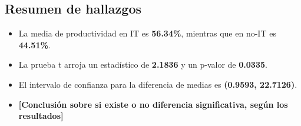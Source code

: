 \subsection{Resumen de hallazgos}

\begin{itemize}
    \item La media de productividad en IT es \textbf{56.34\%}, mientras que en no-IT es \textbf{44.51\%}.
    \item La prueba t arroja un estadístico de \textbf{2.1836} y un p-valor de \textbf{0.0335}.
    \item El intervalo de confianza para la diferencia de medias es \textbf{(0.9593, 22.7126)}.
    \item \textbf{[Conclusión sobre si existe o no diferencia significativa, según los resultados]}
\end{itemize}

\vspace{0.5cm}
\noindent



